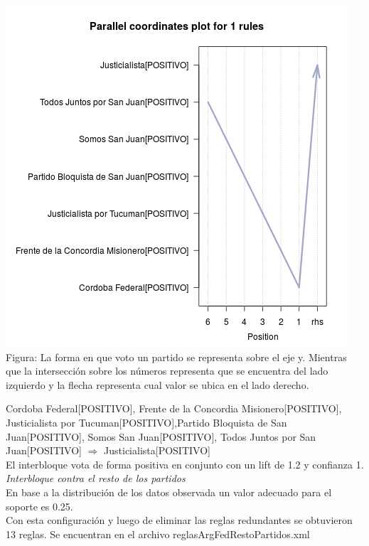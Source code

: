 \documentclass{endm}
\begin{document}
\begin{center}
\includegraphics[scale=0.5]{graficos/paracoordArgFed.png} \\
\scriptsize{Figura: La forma en que voto un partido se representa sobre el eje y. Mientras que la intersección sobre  los números representa que se encuentra del lado izquierdo y la flecha representa cual valor se ubica en el lado derecho.} \\
\end{center}   

{Cordoba Federal[POSITIVO], Frente de la Concordia Misionero[POSITIVO], Justicialista por Tucuman[POSITIVO],Partido Bloquista de San Juan[POSITIVO], Somos San Juan[POSITIVO], Todos Juntos por San Juan[POSITIVO]} $\Longrightarrow$ {Justicialista[POSITIVO]} \\

El interbloque vota de forma positiva en conjunto con un lift de 1.2 y confianza 1. \\

\textit{Interbloque contra el resto de los partidos} \\

En base a la distribución de los datos observada un valor adecuado para el soporte es 0.25. \\

Con esta configuración y luego de eliminar las reglas redundantes se obtuvieron 13 reglas. Se encuentran en el archivo reglasArgFedRestoPartidos.xml  \\
\end{document}
